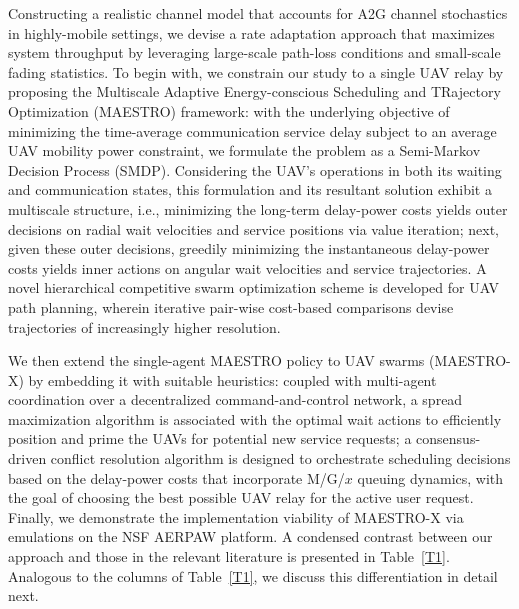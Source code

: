 \documentclass[10pt, twocolumn]{IEEEtran}
\theoremstyle{plain}
\theoremstyle{definition}
\theoremstyle{remark}
\begin{document}
Constructing a realistic channel model that accounts for A2G channel stochastics in highly-mobile settings, we devise a rate adaptation approach that maximizes system throughput by leveraging large-scale path-loss conditions and small-scale fading statistics. To begin with, we constrain our study to a single UAV relay by proposing the Multiscale Adaptive Energy-conscious Scheduling and TRajectory Optimization (MAESTRO) framework:  with the underlying objective of minimizing the time-average communication service delay subject to an average UAV mobility power constraint, we formulate the problem as a Semi-Markov Decision Process (SMDP). Considering the UAV's operations in both its waiting and communication states, this formulation and its resultant solution exhibit a multiscale structure, i.e., minimizing the long-term delay-power costs yields outer decisions on radial wait velocities and service positions via value iteration; next, given these outer decisions, greedily minimizing the instantaneous delay-power costs yields inner actions on angular wait velocities and service trajectories. A novel hierarchical competitive swarm optimization scheme is developed for UAV path planning, wherein iterative pair-wise cost-based comparisons devise trajectories of increasingly higher resolution. 

We then extend the single-agent MAESTRO policy to UAV swarms (MAESTRO-X) by embedding it with suitable heuristics: coupled with multi-agent coordination over a decentralized command-and-control network, a spread maximization algorithm is associated with the optimal wait actions to efficiently position and prime the UAVs for potential new service requests; a consensus-driven conflict resolution algorithm is designed to orchestrate scheduling decisions based on the delay-power costs that incorporate M/G/$x$ queuing dynamics, with the goal of choosing the best possible UAV relay for the active user request. Finally, we demonstrate the implementation viability of MAESTRO-X via emulations on the NSF AERPAW platform. A condensed contrast between our approach and those in the relevant literature is presented in Table~\ref{T1}. Analogous to the columns of Table~\ref{T1}, we discuss this differentiation in detail next.
\end{document}
